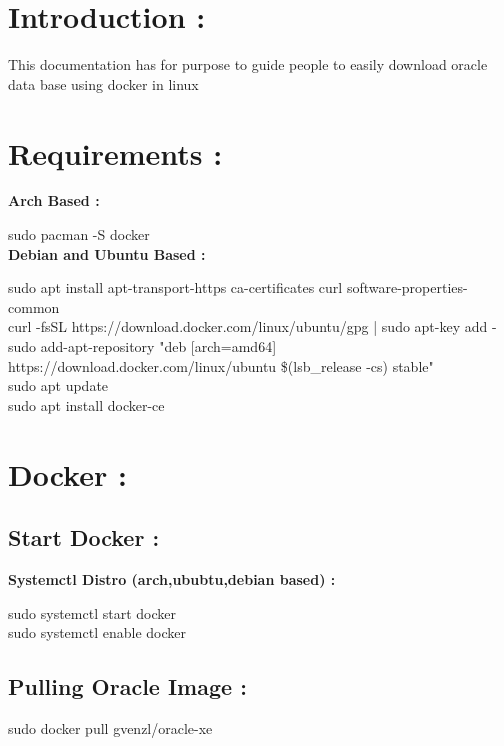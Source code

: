 \documentclass{article}
\begin{document}
\section{Introduction : }
This documentation has for purpose to guide people to easily download oracle data base using
docker in linux  
\section{Requirements : }
\begin{tcolorbox}[title = Installing Docker]
    \textbf{Arch Based : }

         sudo pacman -S docker\\

    \textbf{Debian and Ubuntu Based :}

sudo apt install apt-transport-https ca-certificates curl software-properties-common\\
curl -fsSL https://download.docker.com/linux/ubuntu/gpg | sudo apt-key add -\\
sudo add-apt-repository "deb [arch=amd64] https://download.docker.com/linux/ubuntu \$(lsb\_release -cs) stable"\\
sudo apt update\\
sudo apt install docker-ce\\

\end{tcolorbox}
\section{Docker : }
\subsection{Start Docker :}
\begin{tcolorbox}[title = starting docker]
    \textbf{Systemctl Distro (arch,ububtu,debian based) :}

    sudo systemctl start docker\\
    sudo systemctl enable docker\\

\end{tcolorbox}
\subsection{Pulling Oracle Image :}
\begin{tcolorbox}[title = Pulling oracle-xe]

    sudo docker pull gvenzl/oracle-xe\\

\end{tcolorbox}
\end{document}
